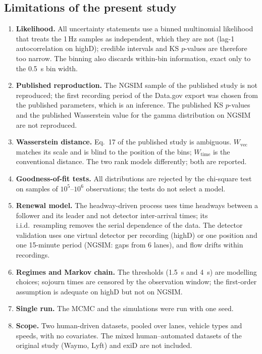 \documentclass[11pt,a4paper]{article}
\numberwithin{equation}{section}
\newcommand{\Wvec}{W_{\mathrm{vec}}}
\newcommand{\Wtime}{W_{\mathrm{time}}}
\begin{document}
\subsection{Limitations of the present study}
\begin{enumerate}
  \item \textbf{Likelihood.} All uncertainty statements use a binned multinomial likelihood that treats the 1\,Hz samples as independent, which they are not (lag-1 autocorrelation \hdLagOne{} on highD); credible intervals and KS $p$-values are therefore too narrow. The binning also discards within-bin information, exact only to the 0.5~s bin width.
  \item \textbf{Published reproduction.} The NGSIM sample of the published study is not reproduced; the first recording period of the Data.gov export was chosen from the published parameters, which is an inference. The published KS $p$-values and the published Wasserstein value for the gamma distribution on NGSIM are not reproduced.
  \item \textbf{Wasserstein distance.} Eq.~17 of the published study is ambiguous. $\Wvec$ matches its scale and is blind to the position of the bins; $\Wtime$ is the conventional distance. The two rank models differently; both are reported.
  \item \textbf{Goodness-of-fit tests.} All distributions are rejected by the chi-square test on samples of $10^5$--$10^6$ observations; the tests do not select a model.
  \item \textbf{Renewal model.} The headway-driven process uses time headways between a follower and its leader and not detector inter-arrival times; its i.i.d.\ resampling removes the serial dependence of the data. The detector validation uses one virtual detector per recording (highD) or one position and one 15-minute period (NGSIM: \ngDetN{} gaps from 6 lanes), and flow drifts within recordings.
  \item \textbf{Regimes and Markov chain.} The thresholds (1.5~s and 4~s) are modelling choices; sojourn times are censored by the observation window; the first-order assumption is adequate on highD but not on NGSIM.
  \item \textbf{Single run.} The MCMC and the simulations were run with one seed.
  \item \textbf{Scope.} Two human-driven datasets, pooled over lanes, vehicle types and speeds, with no covariates. The mixed human--automated datasets of the original study (Waymo, Lyft) and exiD are not included.
\end{enumerate}
\end{document}
